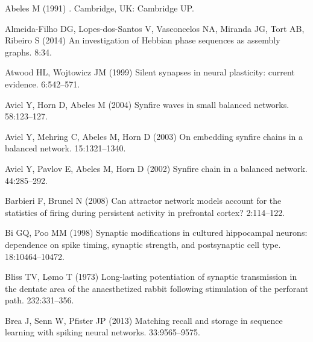
\begin{thebibliography}{}

Abeles M (1991{\rm{}})
.
\newblock Cambridge, UK: Cambridge UP.

Almeida-Filho DG, Lopes-dos-Santos V, Vasconcelos NA, Miranda JG,
  Tort AB, Ribeiro S (2014{\rm{}})
\newblock An investigation of Hebbian phase sequences as assembly graphs.
 8:34.

Atwood HL, Wojtowicz JM (1999{\rm{}})
\newblock Silent synapses in neural plasticity: current evidence.
 6:542--571.

Aviel Y, Horn D, Abeles M (2004{\rm{}})
\newblock Synfire waves in small balanced networks.
 58:123--127.

Aviel Y, Mehring C, Abeles M, Horn D (2003{\rm{}})
\newblock On embedding synfire chains in a balanced network.
 15:1321--1340.

Aviel Y, Pavlov E, Abeles M, Horn D (2002{\rm{}})
\newblock Synfire chain in a balanced network.
 44:285--292.

Barbieri F, Brunel N (2008{\rm{}})
\newblock Can attractor network models account for the statistics of firing during persistent activity in prefrontal cortex?
 2:114--122.

Bi GQ, Poo MM (1998{\rm{}})
\newblock Synaptic modifications in cultured hippocampal neurons: dependence on
  spike timing, synaptic strength, and postsynaptic cell type.
 18:10464--10472.

Bliss TV, L{\o}mo T (1973{\rm{}})
\newblock Long-lasting potentiation of synaptic transmission in the dentate
  area of the anaesthetized rabbit following stimulation of the perforant path.
 232:331--356.

Brea J, Senn W, Pfister JP (2013{\rm{}})
\newblock Matching recall and storage in sequence learning with spiking neural networks.
 33:9565--9575.


\end{thebibliography}
